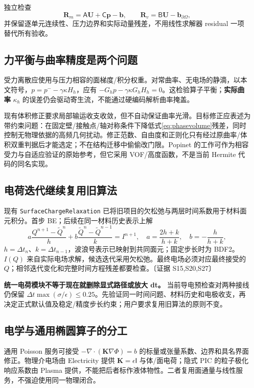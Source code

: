 \documentclass[UTF8,a4paper,11pt,fontset=fandol]{ctexart}
\numberwithin{equation}{section}
\newcommand{\code}[1]{\nolinkurl{#1}}
\newcommand{\ev}[1]{\textcolor{accent}{〔证据 #1〕}}
\newcommand{\dt}{\Delta t}
\newcommand{\mat}[1]{\mathsf{#1}}
\begin{document}
独立检查
\begin{equation}
 \bm R_m=\mat A\bm U+\mat C\bm p-\bm b,\qquad
 \bm R_v=\mat B\bm U-\bm b_{\partial\Omega},
\end{equation}
并保留逐单元连续性、压力边界和实际动量残差，不用线性求解器 residual 一项替代所有验收。

\subsection{力平衡与曲率精度是两个问题}
受力离散应使用与压力相容的面梯度/积分权重。对常曲率、无电场的静滴，以本文符号，$p=p^- -\gamma\kappa H_h$，应有 $-G_hp-\gamma\kappa G_hH_h=0$。这检验算子平衡；\textbf{实际曲率} $\kappa_h$ 的误差仍会驱动寄生流，不能通过硬编码解析曲率掩盖。

现有体积修正要求局部输运收支收敛，但不自动保证曲率光滑。目标修正应表述为带约束问题：在固定壁/接触点/轴对称条件下降低式\eqref{eq:phasevolume}残差，同时控制无物理依据的高频几何扰动。修正范数、自由度和正则化只有经过原曲率/体积双重判据后才能选定；不在结构迁移中偷偷改门限。Popinet 的工作可作为相容受力与自适应验证的原始参考，但它采用 VOF/高度函数，不是当前 Hermite 代码的同名实现\cite{popinet}。

\subsection{电荷迭代继续复用旧算法}
现有 \code{SurfaceChargeRelaxation} 已将旧项目的欠松弛与两层时间系数用于材料面元积分。首步 BE；后续在同一材料历史表示上解
\begin{equation}
 a\frac{Q^{n+1}-\widetilde Q^n}{h}
 +b\frac{\widetilde Q^n-\widetilde Q^{n-1}}{k}
 =I^{n+1},\quad
 a=\frac{2h+k}{h+k},\quad b=-\frac{h}{h+k},\label{eq:bdf}
\end{equation}
$h=\dt_n$、$k=\dt_{n-1}$，波浪号表示已映射到共同面元；固定步长时为 BDF2。$I(Q)$ 来自实际电场求解，候选迭代采用欠松弛。最终电场必须对应最终接受的 $Q$；相邻迭代变化和完整时间方程残差都要检查。\ev{S15,S20,S27}

\textbf{统一电荷模块不等于现在就删除显式路径或放大 dt。} 当前导电预检查对两种接线仍保留 $\dt\max(\sigma/\epsilon)\le0.25$。先验证同一时间问题、材料历史和电极收支，再决定正式默认值及稳定/精度步长约束；用户要求复用旧算法的原则不变。

\subsection{电学与通用椭圆算子的分工}
通用 Poisson 服务可接受 $-\nabla\cdot(\bm K\nabla\Phi)=b$ 的标量或张量系数、边界和具名界面修正。物理介电场由 Electricity 提供 $\bm K=\epsilon\mat I$ 与体/面电荷；隐式 PIC 的粒子极化响应系数由 Plasma 提供，不能把后者标作液体物性。二者复用面通量与线性服务，不强迫使用同一物理闭合。
\end{document}

